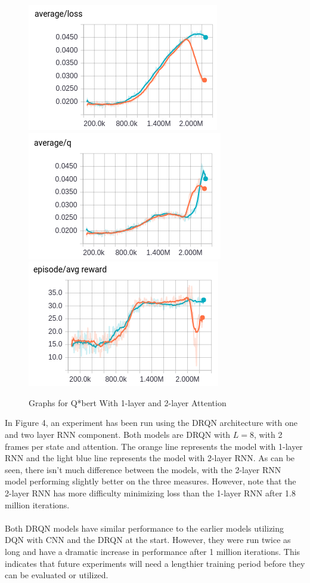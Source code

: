\documentclass{article}
\begin{document}
\begin{figure}[h]
    \centering
    \begin{minipage}{1.0\textwidth}
        \centering
        \includegraphics[scale=0.4]{attention-avg_loss}
        \centering
        \includegraphics[scale=0.4]{attention-avg_q}
        \centering
        \includegraphics[scale=0.4]{attention-episode_avg_reward}
    \end{minipage}
    \caption{Graphs for Q*bert With 1-layer and 2-layer Attention}
\end{figure}

In Figure 4, an experiment has been run using the DRQN architecture with one and two layer RNN component. Both models are DRQN with $L = 8$, with 2 frames per state and attention. The orange line represents the model with 1-layer RNN and the light blue line represents the model with 2-layer RNN. As can be seen, there isn't much difference between the models, with the 2-layer RNN model performing slightly better on the three measures. However, note that the 2-layer RNN has more difficulty minimizing loss than the 1-layer RNN after 1.8 million iterations. \\
\\
Both DRQN models have similar performance to the earlier models utilizing DQN with CNN and the DRQN at the start. However, they were run twice as long and have a dramatic increase in performance after 1 million iterations. This indicates that future experiments will need a lengthier training period before they can be evaluated or utilized.
\end{document}
